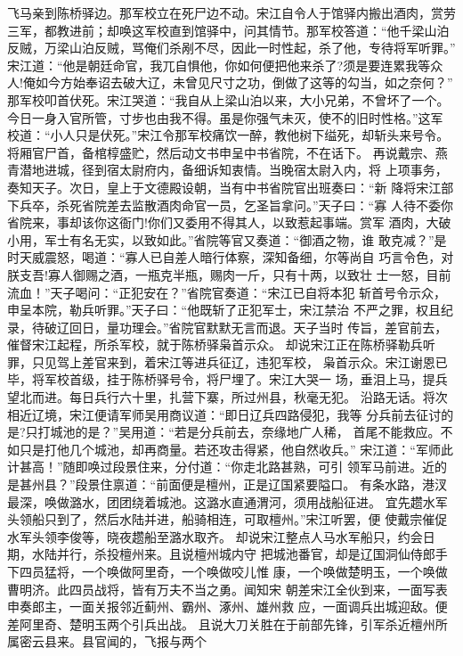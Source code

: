 飞马亲到陈桥驿边。那军校立在死尸边不动。宋江自令人于馆驿内搬出酒肉，赏劳
三军，都教进前；却唤这军校直到馆驿中，问其情节。那军校答道：“他千梁山泊
反贼，万梁山泊反贼，骂俺们杀剐不尽，因此一时性起，杀了他，专待将军听罪。”
宋江道：“他是朝廷命官，我兀自惧他，你如何便把他来杀了?须是要连累我等众
人!俺如今方始奉诏去破大辽，未曾见尺寸之功，倒做了这等的勾当，如之奈何？”
那军校叩首伏死。宋江哭道：“我自从上梁山泊以来，大小兄弟，不曾坏了一个。
今日一身入官所管，寸步也由我不得。虽是你强气未灭，使不的旧时性格。”这军
校道：“小人只是伏死。”宋江令那军校痛饮一醉，教他树下缢死，却斩头来号令。
将厢官尸首，备棺椁盛贮，然后动文书申呈中书省院，不在话下。
再说戴宗、燕青潜地进城，径到宿太尉府内，备细诉知衷情。当晚宿太尉入内，将
上项事务，奏知天子。次日，皇上于文德殿设朝，当有中书省院官出班奏曰：“新
降将宋江部下兵卒，杀死省院差去监散酒肉命官一员，乞圣旨拿问。”天子曰：“寡
人待不委你省院来，事却该你这衙门!你们又委用不得其人，以致惹起事端。赏军
酒肉，大破小用，军士有名无实，以致如此。”省院等官又奏道：“御酒之物，谁
敢克减？”是时天威震怒，喝道：“寡人已自差人暗行体察，深知备细，尔等尚自
巧言令色，对朕支吾!寡人御赐之酒，一瓶克半瓶，赐肉一斤，只有十两，以致壮
士一怒，目前流血！”天子喝问：“正犯安在？”省院官奏道：“宋江已自将本犯
斩首号令示众，申呈本院，勒兵听罪。”天子曰：“他既斩了正犯军士，宋江禁治
不严之罪，权且纪录，待破辽回日，量功理会。”省院官默默无言而退。天子当时
传旨，差官前去，催督宋江起程，所杀军校，就于陈桥驿枭首示众。
却说宋江正在陈桥驿勒兵听罪，只见驾上差官来到，着宋江等进兵征辽，违犯军校，
枭首示众。宋江谢恩已毕，将军校首级，挂于陈桥驿号令，将尸埋了。宋江大哭一
场，垂泪上马，提兵望北而进。每日兵行六十里，扎营下寨，所过州县，秋毫无犯。
沿路无话。将次相近辽境，宋江便请军师吴用商议道：“即日辽兵四路侵犯，我等
分兵前去征讨的是?只打城池的是？”吴用道：“若是分兵前去，奈缘地广人稀，
首尾不能救应。不如只是打他几个城池，却再商量。若还攻击得紧，他自然收兵。”
宋江道：“军师此计甚高！”随即唤过段景住来，分付道：“你走北路甚熟，可引
领军马前进。近的是甚州县？”段景住禀道：“前面便是檀州，正是辽国紧要隘口。
有条水路，港汊最深，唤做潞水，团团绕着城池。这潞水直通渭河，须用战船征进。
宜先趱水军头领船只到了，然后水陆并进，船骑相连，可取檀州。”宋江听罢，便
使戴宗催促水军头领李俊等，晓夜趱船至潞水取齐。
却说宋江整点人马水军船只，约会日期，水陆并行，杀投檀州来。且说檀州城内守
把城池番官，却是辽国洞仙侍郎手下四员猛将，一个唤做阿里奇，一个唤做咬儿惟
康，一个唤做楚明玉，一个唤做曹明济。此四员战将，皆有万夫不当之勇。闻知宋
朝差宋江全伙到来，一面写表申奏郎主，一面关报邻近蓟州、霸州、涿州、雄州救
应，一面调兵出城迎敌。便差阿里奇、楚明玉两个引兵出战。
且说大刀关胜在于前部先锋，引军杀近檀州所属密云县来。县官闻的，飞报与两个
